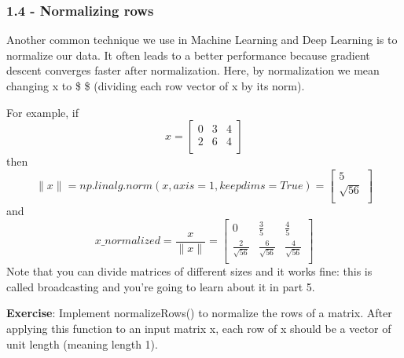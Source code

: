 \documentclass[11pt]{article}
\begin{document}
    \hypertarget{normalizing-rows}{%
\subsubsection{1.4 - Normalizing rows}\label{normalizing-rows}}

Another common technique we use in Machine Learning and Deep Learning is
to normalize our data. It often leads to a better performance because
gradient descent converges faster after normalization. Here, by
normalization we mean changing x to \$  \$ (dividing
each row vector of x by its norm).

For example, if \[x = 
\begin{bmatrix}
    0 & 3 & 4 \\
    2 & 6 & 4 \\
\end{bmatrix}\tag{3}\] then
\[\| x\| = np.linalg.norm(x, axis = 1, keepdims = True) = \begin{bmatrix}
    5 \\
    \sqrt{56} \\
\end{bmatrix}\tag{4} \]and
\[ x\_normalized = \frac{x}{\| x\|} = \begin{bmatrix}
    0 & \frac{3}{5} & \frac{4}{5} \\
    \frac{2}{\sqrt{56}} & \frac{6}{\sqrt{56}} & \frac{4}{\sqrt{56}} \\
\end{bmatrix}\tag{5}\] Note that you can divide matrices of different
sizes and it works fine: this is called broadcasting and you're going to
learn about it in part 5.

\textbf{Exercise}: Implement normalizeRows() to normalize the rows of a
matrix. After applying this function to an input matrix x, each row of x
should be a vector of unit length (meaning length 1).
\end{document}
